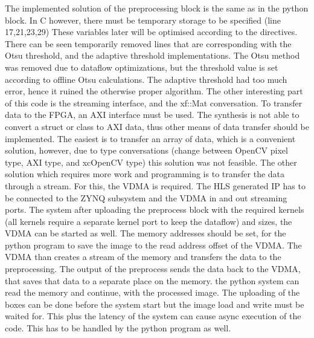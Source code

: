 The implemented solution of the preprocessing block is the same as in the python block.
In C however, there must be temporary storage to be specified (line 17,21,23,29)
These variables later will be optimised according to the directives.
There can be seen temporarily removed lines that are corresponding with the Otsu threshold, and the adaptive threshold implementations.
The Otsu method was removed due to dataflow optimizations, but the threshold value is set according to offline Otsu calculations.
The adaptive threshold had too much error, hence it ruined the otherwise proper algorithm.
The other interesting part of this code is the streaming interface, and the xf::Mat conversation.
To transfer data to the FPGA, an AXI interface must be used.
The synthesis is not able to convert a struct or class to AXI data, thus other means of data transfer should be implemented.
The easiest is to transfer an array of data, which is a convenient solution, however, due to type conversations (change between OpenCV pixel type, AXI type, and xcOpenCV type) this solution was not feasible.
The other solution which requires more work and programming is to transfer the data through a stream.
For this, the VDMA is required.
The HLS generated IP has to be connected to the ZYNQ subsystem and the VDMA in and out streaming ports.
The system after uploading the preprocess block with the required kernels (all kernels require a separate kernel port to keep the dataflow) and sizes, the VDMA can be started as well.
The memory addresses should be set, for the python program to save the image to the read address offset of the VDMA.
The VDMA than creates a stream of the memory and transfers the data to the preprocessing.
The output of the preprocess sends the data back to the VDMA, that saves that data to a separate place on the memory.
the python system can read the memory and continue, with the processed image.
The uploading of the boxes can be done before the system start but the image load and write must be waited for.
This plus the latency of the system can cause async execution of the code.
This has to be handled by the python program as well.

